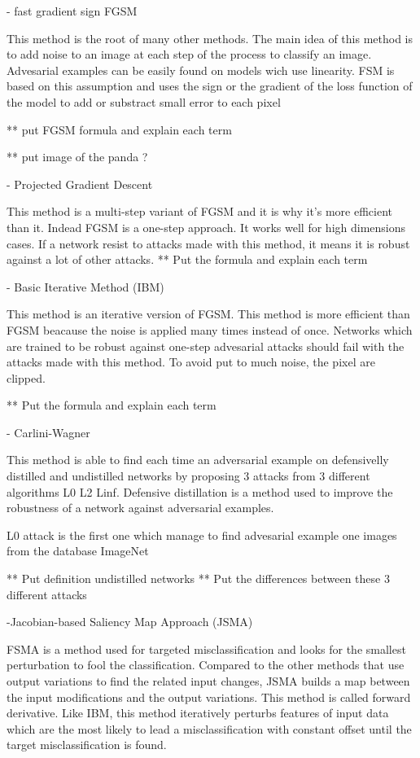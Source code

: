 - fast gradient sign FGSM

This method is the root of many other methods. The main idea of this method is to add noise to an image at each step of the process to classify an image. Advesarial examples can be easily found on models wich use linearity. FSM is based on this assumption and uses the sign or the gradient of the loss function of the model to add or substract small error to each pixel

** put FGSM formula and explain each term

** put image of the panda ?


- Projected Gradient Descent

This method is a multi-step variant of FGSM and it is why it's more efficient than it. Indead FGSM is a one-step approach.
It works well for high dimensions cases. 
If a network resist to attacks made with this method, it means it is robust against a lot of other attacks.
** Put the formula and explain each term

- Basic Iterative Method (IBM)

This method is an iterative version of FGSM. This method is more efficient than FGSM beacause the noise is applied many times instead of once.  Networks which are trained to be robust against one-step advesarial attacks should fail with the attacks made with this method. To avoid put to much noise, the pixel are clipped.

** Put the formula and explain each term

- Carlini-Wagner

This method is able to find each time an adversarial example on defensivelly distilled and undistilled networks by proposing  3 attacks from 3  different algorithms L0 L2 Linf.  Defensive distillation is a method used to improve the robustness of a network against adversarial examples.

L0 attack  is the first one which manage to find advesarial example one images from the database ImageNet

** Put definition undistilled networks
** Put the differences between these 3 different attacks

-Jacobian-based Saliency Map Approach (JSMA)

FSMA is a method  used for targeted misclassification and looks for the smallest perturbation to fool the classification. Compared to the other methods that use output variations to find the related input changes, JSMA builds a map between the input modifications and the output variations. This method is called forward derivative. Like IBM, this method iteratively perturbs features of input data which are the most likely to lead a misclassification with constant offset until the target misclassification is found.

